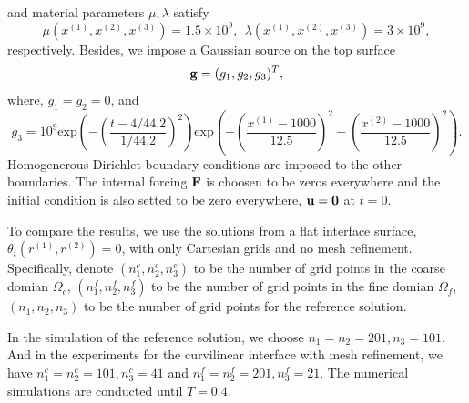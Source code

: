 \documentclass[a4paper]{article}
\begin{document}
and material parameters $\mu, \lambda$ satisfy
\begin{equation}
\mu(x^{(1)},x^{(2)},x^{(3)}) = 1.5\times 10^9,\ \ 
\lambda(x^{(1)},x^{(2)},x^{(3)})  = 3\times 10^9,
\end{equation}
respectively. Besides, we impose a Gaussian source on the top surface
\[{\bf g} = (g_1,g_2,g_3)^T ,\]
where, $g_1 = g_2 = 0$, and 
\[g_3 = 10^9 \text{exp}\left(-\left(\frac{t-4/44.2}{1/44.2}\right)^2\right)\text{exp}\left(-\left(\frac{x^{(1)}-1000}{12.5}\right)^2-\left(\frac{x^{(2)}-1000}{12.5}\right)^2\right).\]
Homogenerous Dirichlet boundary conditions are imposed to the other boundaries. The internal forcing ${\bf F}$ is choosen to be zeros everywhere and the initial condition is also setted to be zero everywhere, ${\bf u} = {\bf 0}$ at $t = 0$.

To compare the results, we use the solutions from a flat interface surface, $\theta_i(r^{(1)},r^{(2)}) = 0$, with only Cartesian grids and no mesh refinement. Specifically, denote $(n_1^c,n_2^c,n_3^c)$ to be the number of grid points in the coarse domian $\Omega_c$, $(n_1^f,n_2^f,n_3^f)$ to be the number of grid points in the fine domian $\Omega_f$, $(n_1,n_2,n_3)$ to be the number of grid points for the reference solution.

In the simulation of the reference solution, we choose $n_1 = n_2 = 201, n_3 = 101$. And in the experiments for the curvilinear interface with mesh refinement, we have $n_1^c = n_2^c = 101, n_3^c = 41$ and $n_1^f = n_2^f = 201, n_3^f = 21$. The numerical simulations are conducted until $T = 0.4$.
\end{document}
